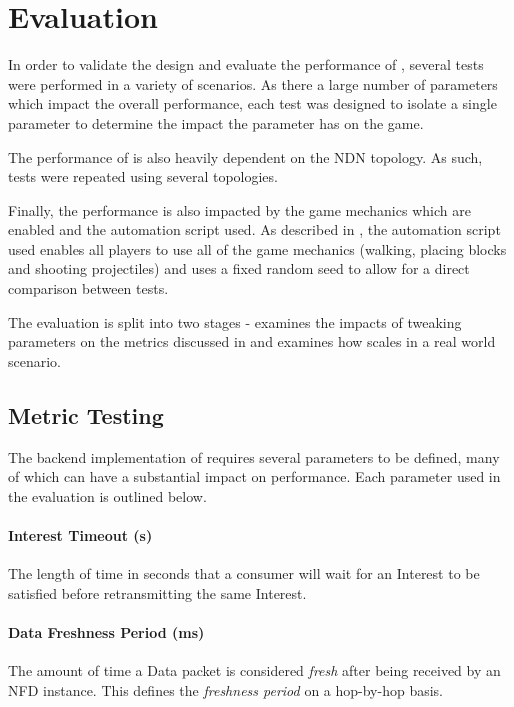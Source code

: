 \chapter{Evaluation}\label{eval}
In order to validate the design and evaluate the performance of \game{}, several tests were performed in a variety of scenarios. As there a large number of parameters which impact the overall performance, each test was designed to isolate a single parameter to determine the impact the parameter has on the game.

The performance of \game{} is also heavily dependent on the NDN topology. As such, tests were repeated using several topologies.

Finally, the performance is also impacted by the game mechanics which are enabled and the automation script used. As described in , the automation script used enables all players to use all of the game mechanics (walking, placing blocks and shooting projectiles) and uses a fixed random seed to allow for a direct comparison between tests.


The evaluation is split into two stages -  examines the impacts of tweaking parameters on the metrics discussed in  and  examines how \game{} scales in a real world scenario.


\section{Metric Testing}\label{sec:eval:metrics-testing}
The backend implementation of \game{} requires several parameters to be defined, many of which can have a substantial impact on performance. Each parameter used in the evaluation is outlined below.

\subsubsection*{Interest Timeout (s)}
The length of time in seconds that a consumer will wait for an Interest to be satisfied before retransmitting the same Interest.

\subsubsection*{Data Freshness Period (ms)}
The amount of time a Data packet is considered \textit{fresh} after being received by an NFD instance. This defines the \textit{freshness period} on a hop-by-hop basis.


